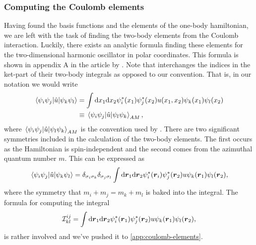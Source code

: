         \subsubsection{Computing the Coulomb elements}
            Having found the basis functions and the elements of the one-body
            hamiltonian, we are left with the task of finding the two-body
            elements from the Coulomb interaction.
            Luckily, there exists an analytic formula finding these elements for
            the two-dimensional harmonic oscillator in polar coordinates.
            This formula is shown in appendix A in the article
             by
            \citeauthor{anisimovas1998energy} \cite{anisimovas1998energy}.
            Note that \citeauthor{anisimovas1998energy} interchanges the indices
            in the ket-part of their two-body integrals as opposed to our
            convention. That is, in our notation we would write
            \begin{align}
                \mel*{\psi_i\psi_j}{\hat{u}}{\psi_k\psi_l}
                &=
                \int\dd x_1\dd x_2
                \psi_{i}^{*}(x_1) \psi_{j}^{*}(x_2)
                u(x_1, x_2)
                \psi_{k}(x_1)\psi_{l}(x_2)
                \\
                &\equiv
                \mel*{\psi_i\psi_j}{\hat{u}}{\psi_l\psi_k}_{AM},
            \end{align}
            where $ \mel*{\psi_i\psi_j}{\hat{u}}{\psi_l\psi_k}_{AM}$ is the convention used by
            \citeauthor{anisimovas1998energy}.
            There are two significant symmetries included in the calculation of
            the two-body elements.
            The first occurs as the Hamiltonian is spin-independent and the
            second comes from the azimuthal quantum number $m$.
            This can be expressed as
            \begin{align}
                \mel*{\psi_i\psi_j}{\hat{u}}{\psi_k\psi_l}
                = \delta_{\sigma_i \sigma_k} \delta_{\sigma_j \sigma_l}
                \int\dd \boldsymbol{r}_1\dd \boldsymbol{r}_2
                \psi_{i}^{*}(\boldsymbol{r}_i) \psi_{j}^{*}(\boldsymbol{r}_2)
                u
                \psi_{k}(\boldsymbol{r}_1)\psi_{l}(\boldsymbol{r}_2),
            \end{align}
            where the symmetry that $m_i + m_j = m_k + m_l$ is baked into the
            integral.
            The formula for computing the integral
            \begin{align}
                \mathcal{I}^{ij}_{kl}
                =
                \int\dd \boldsymbol{r}_1\dd \boldsymbol{r}_2
                \psi_{i}^{*}(\boldsymbol{r}_1) \psi_{j}^{*}(\boldsymbol{r}_2)
                u
                \psi_{k}(\boldsymbol{r}_1)\psi_{l}(\boldsymbol{r}_2),
            \end{align}
            is rather involved and we've pushed it to
            \autoref{app:coulomb-elements}.


